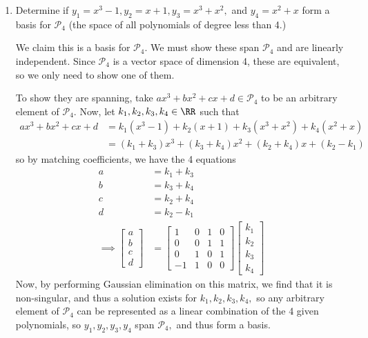 \documentclass{article}
\begin{document}
\begin{enumerate}
	\item Determine if $y_1=x^3-1, y_2=x+1, y_3=x^3+x^2,$ and $y_4=x^2+x$ form a basis for $\mathcal P_4$ (the space of all polynomials of degree less than 4.)
		\begin{soln}
			We claim this is a basis for $\mathcal P_4.$ We must show these span $\mathcal P_4$ and are linearly independent. Since $\mathcal P_4$ is a vector space of dimension 4, these are equivalent, so we only need to show one of them.

			To show they are spanning, take $ax^3+bx^2+cx+d\in\mathcal P_4$ to be an arbitrary element of $\mathcal P_4.$ Now, let $k_1, k_2, k_3, k_4\in\RR$ such that
			\begin{align*}
				ax^3+bx^2+cx+d &= k_1(x^3-1) + k_2(x+1) + k_3(x^3+x^2) + k_4(x^2+x) \\
				&= (k_1+k_3)x^3 + (k_3+k_4)x^2 + (k_2+k_4)x + (k_2-k_1)
			\end{align*}
			so by matching coefficients, we have the 4 equations
			\begin{align*}
				a &= k_1+k_3 \\
				b &= k_3+k_4 \\
				c &= k_2+k_4 \\
				d &= k_2-k_1 \\
				\implies \begin{bmatrix}
					a \\ b \\ c \\ d
				\end{bmatrix} &= \begin{bmatrix}
					1 & 0 & 1 & 0 \\
					0 & 0 & 1 & 1 \\
					0 & 1 & 0 & 1 \\
					-1 & 1 & 0 & 0
				\end{bmatrix}\begin{bmatrix}
					k_1 \\ k_2 \\ k_3 \\ k_4
				\end{bmatrix}
			\end{align*}
			Now, by performing Gaussian elimination on this matrix, we find that it is non-singular, and thus a solution exists for $k_1, k_2, k_3, k_4,$ so any arbitrary element of $\mathcal P_4$ can be represented as a linear combination of the 4 given polynomials, so $y_1, y_2, y_3, y_4$ span $\mathcal P_4,$ and thus form a basis.


\end{soln}
\end{enumerate}
\end{document}
